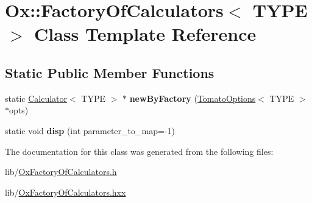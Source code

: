 \hypertarget{class_ox_1_1_factory_of_calculators}{\section{Ox\-:\-:Factory\-Of\-Calculators$<$ T\-Y\-P\-E $>$ Class Template Reference}
\label{class_ox_1_1_factory_of_calculators}
}
\subsection*{Static Public Member Functions}
\begin{DoxyCompactItemize}
\item 
\hypertarget{class_ox_1_1_factory_of_calculators_a43c28f519cc510bc1c8d1a86b14512b4}{static \hyperlink{class_ox_1_1_calculator}{Calculator}$<$ T\-Y\-P\-E $>$ $\ast$ {\bfseries new\-By\-Factory} (\hyperlink{struct_ox_1_1_tomato_options}{Tomato\-Options}$<$ T\-Y\-P\-E $>$ $\ast$opts)}\label{class_ox_1_1_factory_of_calculators_a43c28f519cc510bc1c8d1a86b14512b4}

\item 
\hypertarget{class_ox_1_1_factory_of_calculators_a80052ba880fca49a529c839b33927b21}{static void {\bfseries disp} (int parameter\-\_\-to\-\_\-map=-\/1)}\label{class_ox_1_1_factory_of_calculators_a80052ba880fca49a529c839b33927b21}

\end{DoxyCompactItemize}


The documentation for this class was generated from the following files\-:\begin{DoxyCompactItemize}
\item 
lib/\hyperlink{_ox_factory_of_calculators_8h}{Ox\-Factory\-Of\-Calculators.\-h}\item 
lib/\hyperlink{_ox_factory_of_calculators_8hxx}{Ox\-Factory\-Of\-Calculators.\-hxx}\end{DoxyCompactItemize}
